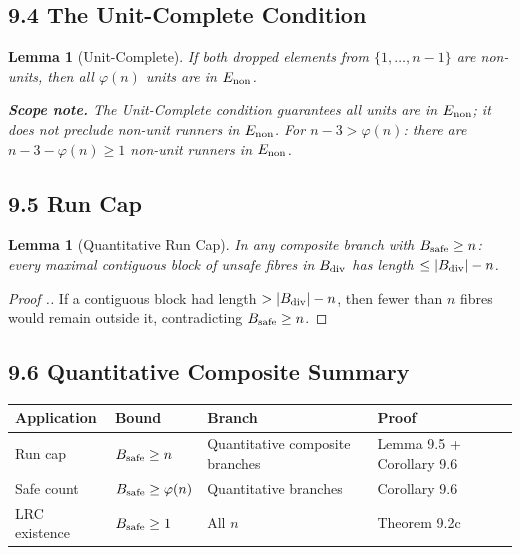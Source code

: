 \documentclass[11pt,a4paper]{article}
\theoremstyle{plain}
\newtheorem{lemma}[theorem]{Lemma}
\theoremstyle{definition}
\theoremstyle{remark}
\begin{document}
\subsection{9.4 The Unit-Complete Condition}



\begin{lemma}[Unit-Complete]
If both dropped elements from $\{1,\ldots,n-1\}$ are non-units, then all $\varphi(n)$ units are in $E_{\rm non}$.

\textbf{Scope note.} The Unit-Complete condition guarantees all units are in $E_{\rm non}$; it does not preclude non-unit runners in $E_{\rm non}$. For $n-3 > \varphi(n)$: there are $n-3-\varphi(n) \geq 1$ non-unit runners in $E_{\rm non}$.

\end{lemma}


\subsection{9.5 Run Cap}



\begin{lemma}[Quantitative Run Cap]
In any composite branch with $B_{\rm safe} \geq n$: every maximal contiguous block of unsafe fibres in $B_{\rm div}$ has length $\leq |B_{\rm div}| - n$.

\end{lemma}

\begin{proof}[Proof .]
If a contiguous block had length $> |B_{\rm div}| - n$, then fewer than $n$ fibres would remain outside it, contradicting $B_{\rm safe} \geq n$.
\end{proof}


\subsection{9.6 Quantitative Composite Summary}



\begin{center}\begin{tabular}{llll}
\toprule
Application & Bound & Branch & Proof \\
\midrule
Run cap & $B_{\rm safe} \geq n$ & Quantitative composite branches & Lemma 9.5 + Corollary 9.6 \\
Safe count & $B_{\rm safe} \geq \varphi(n)$ & Quantitative branches & Corollary 9.6 \\
LRC existence & $B_{\rm safe} \geq 1$ & All $n$ & Theorem 9.2c \\
\bottomrule
\end{tabular}\end{center}
\end{document}
